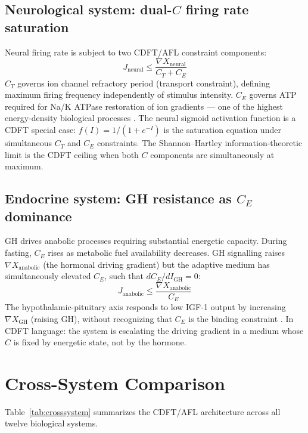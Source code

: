 \documentclass[11pt]{article}
\begin{document}
\subsection{Neurological system: dual-$C$ firing rate saturation}

Neural firing rate is subject to two CDFT/AFL constraint components:
\begin{equation}
J_{\mathrm{neural}} \leq \frac{\nabla X_{\mathrm{neural}}}{C_T + C_E}
\end{equation}
$C_T$ governs ion channel refractory period (transport constraint), defining maximum firing frequency independently of stimulus intensity. $C_E$ governs ATP required for Na/K ATPase restoration of ion gradients --- one of the highest energy-density biological processes \citep{attwell2001,raichle2002}. The neural sigmoid activation function \citep{dayan2001} is a CDFT special case: $f(I) = 1/(1+e^{-I})$ is the saturation equation under simultaneous $C_T$ and $C_E$ constraints. The Shannon--Hartley information-theoretic limit \citep{shannon1948} is the CDFT ceiling when both $C$ components are simultaneously at maximum.

\subsection{Endocrine system: GH resistance as $C_E$ dominance}

GH drives anabolic processes requiring substantial energetic capacity. During fasting, $C_E$ rises as metabolic fuel availability decreases. GH signalling raises $\nabla X_{\mathrm{anabolic}}$ (the hormonal driving gradient) but the adaptive medium has simultaneously elevated $C_E$, such that $dC_E/dI_{\mathrm{GH}} = 0$:
\begin{equation}
J_{\mathrm{anabolic}} \leq \frac{\nabla X_{\mathrm{anabolic}}}{C_E}
\end{equation}
The hypothalamic-pituitary axis responds to low IGF-1 output by increasing $\nabla X_{\mathrm{GH}}$ (raising GH), without recognizing that $C_E$ is the binding constraint \citep{moller2009}. In CDFT language: the system is escalating the driving gradient in a medium whose $C$ is fixed by energetic state, not by the hormone.


\section{Cross-System Comparison}
Table~\ref{tab:crosssystem} summarizes the CDFT/AFL architecture across all twelve biological systems.
\end{document}
